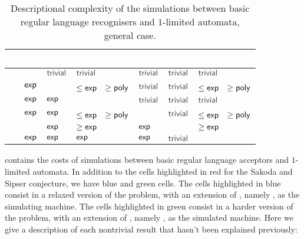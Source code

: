 \begin{table}
	\centering
	\renewcommand{\hstdef}{.55}
	\begin{tabular}{|l|l|l|p{3.1em}|l|l|p{3.1em}|}
		\hline
		~     & \ODFA              & \ONFA     & \TDFA                                            & \TNFA     & \OLA      & \ODLA                                            \\ \hline
		\ODFA & \cY                & $\Cctriv$ & $\Cctriv$                                        & $\Cctriv$ & $\Cctriv$ & $\Cctriv$                                        \\ \hline
		\ONFA & $\mathsf{exp}$            & \cY       & \cR $\le\Cexp\hst$ $\ge\mathsf{poly}$                   & $\Cctriv$ & $\Cctriv$ & \cB $\le\Cexp\hst$ $\ge\mathsf{poly}$                   \\ \hline
		\TDFA & $\mathsf{exp}$            & $\mathsf{exp}$   & \cY                                              & $\Cctriv$ & $\Cctriv$ & $\Cctriv$                                        \\ \hline
		\TNFA & $\mathsf{exp}$            & $\mathsf{exp}$   & \cR $\le\Cexp\hst$ $\ge\mathsf{poly}$                   & \cY       & $\Cctriv$ & \cB $\le\Cexp\hst$ $\ge\mathsf{poly}$                   \\ \hline
		\OLA  & \rbt[.2]{$\Cdexp$} & $\mathsf{exp}$   & \cG \rbt[.2]{$\le\Cdexp\hst[.1]$} $\ge\Cexp\hst$ & $\mathsf{exp}$   & \cY       & \cG \rbt[.2]{$\le\Cdexp\hst[.1]$} $\ge\Cexp\hst$ \\ \hline
		\ODLA & $\mathsf{exp}$            & $\mathsf{exp}$   & $\mathsf{exp}$                                          & $\mathsf{exp}$   & $\Cctriv$ & \cY                                              \\ \hline
	\end{tabular}
	\caption{Descriptional complexity of the simulations between basic regular language recognisers and $1$-limited automata, general case.}
	\label{tab:sims-1la-general}
\end{table}

 contains the costs of simulations between basic regular language acceptors and $1$-limited automata.
In addition to the cells highlighted in red for the Sakoda and Sipser conjecture, we have blue and green cells.
The cells highlighted in blue consist in a relaxed version of the problem, with an extension of \TNFA, namely \ODLA, as the simulating machine.
The cells highlighted in green consist in a harder version of the problem, with an extension of \NFA, namely \OLA, as the simulated machine.
Here we give a description of each nontrivial result that hasn't been explained previously:

